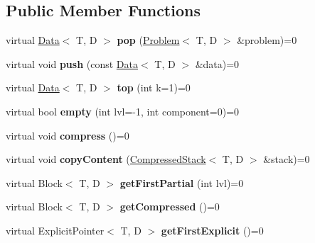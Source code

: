 \subsection*{Public Member Functions}
\begin{DoxyCompactItemize}
\item 
virtual \hyperlink{class_data}{Data}$<$ T, D $>$ {\bfseries pop} (\hyperlink{class_problem}{Problem}$<$ T, D $>$ \&problem)=0\hypertarget{class_stack_a9e0581b3b2328bbb8e7771a8023694f9}{}\label{class_stack_a9e0581b3b2328bbb8e7771a8023694f9}

\item 
virtual void {\bfseries push} (const \hyperlink{class_data}{Data}$<$ T, D $>$ \&data)=0\hypertarget{class_stack_a33267fdecb527b595bcd635c37a102b7}{}\label{class_stack_a33267fdecb527b595bcd635c37a102b7}

\item 
virtual \hyperlink{class_data}{Data}$<$ T, D $>$ {\bfseries top} (int k=1)=0\hypertarget{class_stack_a44af4f85e85b9c2aa9a107e4ce4dfb08}{}\label{class_stack_a44af4f85e85b9c2aa9a107e4ce4dfb08}

\item 
virtual bool {\bfseries empty} (int lvl=-\/1, int component=0)=0\hypertarget{class_stack_a3b11a0cb1ec9e2664ac30c03ac1c0d45}{}\label{class_stack_a3b11a0cb1ec9e2664ac30c03ac1c0d45}

\item 
virtual void {\bfseries compress} ()=0\hypertarget{class_stack_a1afc50dff2d38932d1503de659f833a4}{}\label{class_stack_a1afc50dff2d38932d1503de659f833a4}

\item 
virtual void {\bfseries copy\+Content} (\hyperlink{class_compressed_stack}{Compressed\+Stack}$<$ T, D $>$ \&stack)=0\hypertarget{class_stack_aa49e31081a423393dc601defef220f90}{}\label{class_stack_aa49e31081a423393dc601defef220f90}

\item 
virtual Block$<$ T, D $>$ {\bfseries get\+First\+Partial} (int lvl)=0\hypertarget{class_stack_a7c2afc77f96c5a6a28b42e90cb6639b7}{}\label{class_stack_a7c2afc77f96c5a6a28b42e90cb6639b7}

\item 
virtual Block$<$ T, D $>$ {\bfseries get\+Compressed} ()=0\hypertarget{class_stack_a0cc1315782196cc83ee04595f1c10115}{}\label{class_stack_a0cc1315782196cc83ee04595f1c10115}

\item 
virtual Explicit\+Pointer$<$ T, D $>$ {\bfseries get\+First\+Explicit} ()=0\hypertarget{class_stack_a01d1ca3a7216b2ac911b1702cfe8b2a2}{}\label{class_stack_a01d1ca3a7216b2ac911b1702cfe8b2a2}


\end{DoxyCompactItemize}
